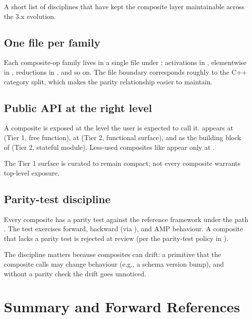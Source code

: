 A short list of disciplines that have kept the composite layer
maintainable across the 3.x evolution.

\subsection{One file per family}
\label{ssec:composite_ops:one_file}

Each composite-op family lives in a single file under
: activations in ,
elementwise in , reductions in
, and so on. The file boundary corresponds
roughly to the C++ category split, which makes the parity
relationship easier to maintain.

\subsection{Public API at the right level}
\label{ssec:composite_ops:api_level}

A composite is exposed at the level the user is expected to call
it.  appears at  (Tier 1, free
function), at  (Tier 2,
functional surface), and as the building block of
 (Tier 2, stateful module). Less-used
composites like  appear only at
.

The Tier 1 surface is curated to remain compact; not every
composite warrants top-level exposure.

\subsection{Parity-test discipline}
\label{ssec:composite_ops:parity_discipline}

Every composite has a parity test against the reference framework
under the path
\allowbreak. The test
exercises forward, backward (via ), and AMP
behaviour. A
composite that lacks a parity test is rejected at review (per the
parity-test policy in ).

The discipline matters because composites can drift: a primitive
that the composite calls may change behaviour (e.g., a schema
version bump), and without a parity check the drift goes
unnoticed.

\section{Summary and Forward References}
\label{sec:composite_ops:summary}

